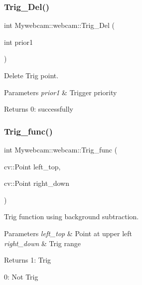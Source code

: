 \subsubsection{\texorpdfstring{Trig\+\_\+\+Del()}{Trig\_Del()}}
{\footnotesize\ttfamily int Mywebcam\+::webcam\+::\+Trig\+\_\+\+Del (\begin{DoxyParamCaption}\item[{int}]{prior1 }\end{DoxyParamCaption})\hspace{0.3cm}{\ttfamily [inline]}}



Delete Trig point. 


\begin{DoxyParams}{Parameters}
{\em prior1} & Trigger priority \\
\hline
\end{DoxyParams}
\begin{DoxyReturn}{Returns}
0\+: successfully 
\end{DoxyReturn}
\mbox{\label{class_mywebcam_1_1webcam_a8c3bece8802fa58e8de968bc65a36fd1}} 
\subsubsection{\texorpdfstring{Trig\+\_\+func()}{Trig\_func()}\hspace{0.1cm}{\footnotesize\ttfamily [1/2]}}
{\footnotesize\ttfamily int Mywebcam\+::webcam\+::\+Trig\+\_\+func (\begin{DoxyParamCaption}\item[{cv\+::\+Point}]{left\+\_\+top,  }\item[{cv\+::\+Point}]{right\+\_\+down }\end{DoxyParamCaption})\hspace{0.3cm}{\ttfamily [inline]}}



Trig function using background subtraction. 


\begin{DoxyParams}{Parameters}
{\em left\+\_\+top} & Point at upper left \\
\hline
{\em right\+\_\+down} & Trig range \\
\hline
\end{DoxyParams}
\begin{DoxyReturn}{Returns}
1\+: Trig 

0\+: Not Trig 
\end{DoxyReturn}
\mbox{\label{class_mywebcam_1_1webcam_aa47dab3d4fb51217bd09150adedbfc27}} 

